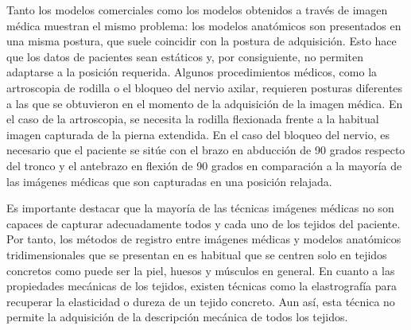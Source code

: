 Tanto los modelos comerciales como los modelos obtenidos a través de imagen médica muestran el mismo problema: los modelos anatómicos son presentados en una misma postura, que suele coincidir con la postura de adquisición. Esto hace que los datos de pacientes sean estáticos y, por consiguiente, no permiten adaptarse a la posición requerida. Algunos procedimientos médicos, como la artroscopia de rodilla o el bloqueo del nervio axilar, requieren posturas diferentes a las que se obtuvieron en el momento de la adquisición de la imagen médica. En el caso de la artroscopia, se necesita la rodilla flexionada frente a la habitual imagen capturada de la pierna extendida. En el caso del bloqueo del nervio, es necesario que el paciente se sitúe con el brazo en abducción de 90 grados respecto del tronco y el antebrazo en flexión de 90 grados en comparación a la mayoría de las imágenes médicas que son capturadas en una posición relajada. 

Es importante destacar que la mayoría de las técnicas imágenes médicas no son capaces de capturar adecuadamente todos y cada uno de los tejidos del paciente. Por tanto, los métodos de registro entre imágenes médicas y modelos anatómicos tridimensionales que se presentan en \cite{ferrante2017slice} es habitual que se centren solo en tejidos concretos como puede ser la piel, huesos y músculos en general. 
En cuanto a las propiedades mecánicas de los tejidos, existen técnicas como la elastrografía \cite{MRIelastography} para recuperar la elasticidad o dureza de un tejido concreto. Aun así, esta técnica no permite la adquisición de la descripción mecánica de todos los tejidos.




